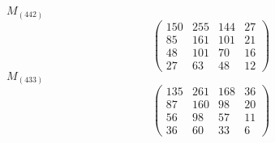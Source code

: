 \documentclass[12pt,reqno]{amsart}
\begin{document}
$M_{(442)}$                             $$ \begin{pmatrix} 
                       150 & 255 & 144 & 27 \\[6pt]
                        85 & 161 & 101 & 21 \\[6pt]
                        48 & 101 & 70 & 16 \\[6pt]
                           27 & 63 & 48 & 12
                              \end{pmatrix} $$ 
$M_{(433)}$                             $$ \begin{pmatrix} 
                       135 & 261 & 168 & 36 \\[6pt]
                        87 & 160 & 98 & 20 \\[6pt]
                         56 & 98 & 57 & 11 \\[6pt]
                           36 & 60 & 33 & 6
                              \end{pmatrix} $$ 
\end{document}
